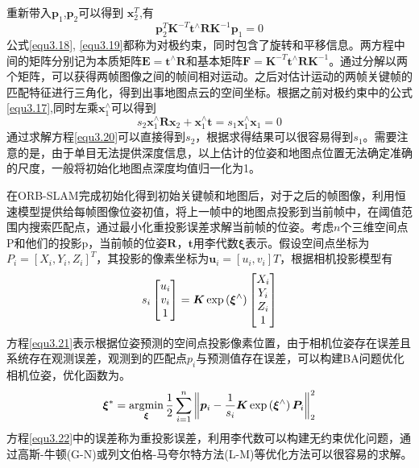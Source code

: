重新带入$\boldsymbol{p}_1$,$\boldsymbol{p}_2$可以得到
$\boldsymbol{x}_2^T$,有
\begin{equation}
\label{equ3.19}
\boldsymbol{p}_2^T \boldsymbol{K}^{-T} \boldsymbol{t}^{\wedge}  \boldsymbol{R} \boldsymbol{K}^{-1} \boldsymbol{p}_1  = 0
\end{equation}
公式\eqref{equ3.18}, \eqref{equ3.19}都称为对极约束，同时包含了旋转和平移信息。两方程中间的矩阵分别记为本质矩阵$\boldsymbol{E} = \boldsymbol{t}^{\wedge}  \boldsymbol{R} $和基本矩阵$\boldsymbol{F} = \boldsymbol{K}^{-T} \boldsymbol{t}^{\wedge}  \boldsymbol{R} \boldsymbol{K}^{-1}$。通过分解以两个矩阵，可以获得两帧图像之间的帧间相对运动。之后对估计运动的两帧关键帧的匹配特征进行三角化，得到出事地图点云的空间坐标。根据之前对极约束中的公式\eqref{equ3.17},同时左乘$\boldsymbol{x}_1^{\wedge}$可以得到
\begin{equation}
\label{equ3.20}
s_2 \boldsymbol{x}_1^{\wedge} \boldsymbol{R} \boldsymbol{x}_2 + \boldsymbol{x}_1^{\wedge} \boldsymbol{t} = s_1 \boldsymbol{x}_1^{\wedge} \boldsymbol{x}_1 = 0
\end{equation}
通过求解方程\eqref{equ3.20}可以直接得到$s_2$，根据求得结果可以很容易得到$s_1$。需要注意的是，由于单目无法提供深度信息，以上估计的位姿和地图点位置无法确定准确的尺度，一般将初始化地图点深度均值归一化为1。

在ORB-SLAM完成初始化得到初始关键帧和地图后，对于之后的帧图像，利用恒速模型提供给每帧图像位姿初值，将上一帧中的地图点投影到当前帧中，在阈值范围内搜索匹配点，通过最小化重投影误差求解当前帧的位姿。考虑$n$个三维空间点P和他们的投影p，当前帧的位姿$\boldsymbol{R}$，$\boldsymbol{t}$用李代数$\boldsymbol{\xi}$表示。假设空间点坐标为$P_i=[X_i,Y_i,Z_i]^T$，其投影的像素坐标为$\boldsymbol{u}_i = [u_i,v_i]T$，根据相机投影模型有
\begin{equation}
\label{equ3.21}
s_i
\begin{bmatrix}
u_i \cr v_i \cr 1\cr 
\end{bmatrix}
=
\boldsymbol{K} \exp\left( \boldsymbol{\xi}^{\wedge} \right)
\begin{bmatrix}
X_i \cr Y_i \cr Z_i \cr 1 \cr
\end{bmatrix}
\end{equation}
方程\eqref{equ3.21}表示根据位姿预测的空间点投影像素位置，由于相机位姿存在误差且系统存在观测误差，观测到的匹配点$p_i$与预测值存在误差，可以构建BA问题优化相机位姿，优化函数为。
\begin{equation}
\label{equ3.22}
\boldsymbol{\xi}^* = \operatorname*{argmin}\limits_{\boldsymbol{\xi}} {1 \over 2} \sum\limits_{i=1}^n  \left \Vert \boldsymbol{p}_i - {1 \over s_i} \boldsymbol{K} \exp\left( \boldsymbol{\xi}^{\wedge} \right) \boldsymbol{P}_i  \right \Vert_2^2
\end{equation}
方程\eqref{equ3.22}中的误差称为重投影误差，利用李代数可以构建无约束优化问题，通过高斯-牛顿(G-N)或列文伯格-马夸尔特方法(L-M)等优化方法可以很容易的求解。

